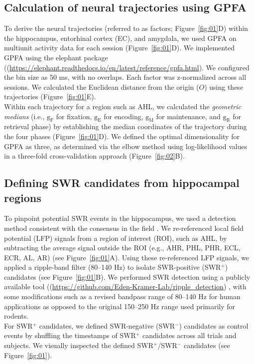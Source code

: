 \documentclass[final,3p,times,twocolumn]{elsarticle}
\begin{document}
\subsection{Calculation of neural trajectories using GPFA}
To derive the neural trajectories (referred to as factors; Figure~\ref{fig:01}D) within the hippocampus, entorhinal cortex (EC), and amygdala, we used GPFA \cite{yu_gaussian-process_2009} on multiunit activity data for each session (Figure~\ref{fig:01}D). We implemented GPFA using the elephant package ((\url{https://elephant.readthedocs.io/en/latest/reference/gpfa.html}). We configured the bin size as 50 ms, with no overlaps. Each factor was z-normalized across all sessions. We calculated the Euclidean distance from the origin ($O$) using these trajectories (Figure~\ref{fig:01}E).
\\
\indent
Within each trajectory for a region such as AHL, we calculated the \textit{geometric medians} (i.e., $\mathrm{g_{F}}$ for fixation, $\mathrm{g_{E}}$ for encoding, $\mathrm{g_{M}}$ for maintenance, and $\mathrm{g_{R}}$ for retrieval phase) by establishing the median coordinates of the trajectory during the four phases (Figure~\ref{fig:01}D). We defined the optimal dimensionality for GPFA as three, as determined via the elbow method using log-likelihood values in a three-fold cross-validation approach (Figure~\ref{fig:02}B).

\subsection{Defining SWR candidates from hippocampal regions}
To pinpoint potential SWR events in the hippocampus, we used a detection method consistent with the consensus in the field \cite{liu_consensus_2022}. We re-referenced local field potential (LFP) signals from a region of interest (ROI), such as AHL, by subtracting the average signal outside the ROI (e.g., AHR, PHL, PHR, ECL, ECR, AL, AR) (see Figure~\ref{fig:01}A). Using these re-referenced LFP signals, we applied a ripple-band filter (80--140 Hz) to isolate SWR-positive (SWR$^+$) candidates (see Figure~\ref{fig:01}B). We performed SWR detection using a publicly available tool ((\url{https://github.com/Eden-Kramer-Lab/ripple_detection}) \cite{kay_hippocampal_2016}, with some modifications such as a revised bandpass range of 80--140 Hz for human applications \cite{norman_hippocampal_2019,norman_hippocampal_2021} as opposed to the original 150--250 Hz range used primarily for rodents.
\\
\indent
For SWR$^+$ candidates, we defined SWR-negative (SWR$^-$) candidates as control events by shuffling the timestamps of SWR$^+$ candidates across all trials and subjects. We visually inspected the defined SWR$^+$/SWR$^-$ candidates (see Figure~\ref{fig:01}).
\end{document}
